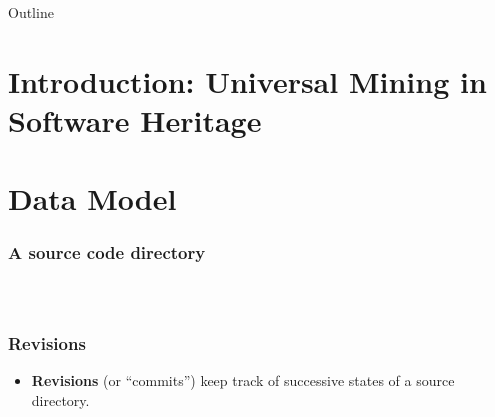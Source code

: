 \documentclass[aspectratio=169,xcolor=table]{beamer}
\begin{document}
    \maketitle

    \begin{frame}{Outline}
        \tableofcontents
    \end{frame}

    \section{Introduction: Universal Mining in Software Heritage}

    \section{Data Model}

    \begin{frame}
        \frametitle{A source code directory}

        \begin{columns}
            \begin{figure}
                \begin{minipage}{\textwidth}
            \end{minipage}
            \end{figure}
            \begin{figure}
                \centering
                \scalebox{0.9}{}
            \end{figure}
        \end{columns}
    \end{frame}

    \begin{frame}
        \frametitle{Revisions}
        \begin{block}{}
            \begin{itemize}
                \item \textbf{Revisions} (or ``commits'') keep track of
                    successive states of a source directory.
            \end{itemize}
        \end{block}
        \vfill
        \begin{figure}
            \centering
            \scalebox{0.8}{}
        \end{figure}
    \end{frame}
\end{document}
